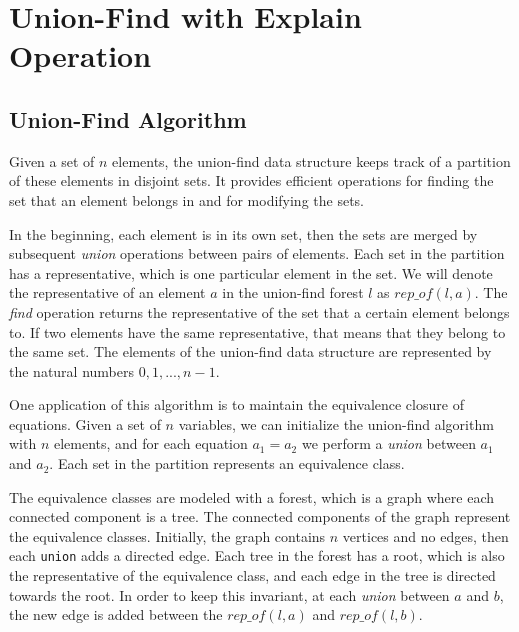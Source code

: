 
\chapter{Union-Find with Explain Operation}\label{chapter:union_find}

\section{Union-Find Algorithm}
\label{section:uf-algorithm}

Given a set of $n$ elements, the union-find data structure keeps track of a partition of these elements in disjoint sets. It provides efficient operations for finding the set that an element belongs in and for modifying the sets.

In the beginning, each element is in its own set, then the sets are merged by subsequent \emph{union} operations between pairs of elements. Each set in the partition has a representative, which is one particular element in the set. We will denote the representative of an element $a$ in the union-find forest $l$ as $rep\_of(l, a)$. The \emph{find} operation returns the representative of the set that a certain element belongs to. If two elements have the same representative, that means that they belong to the same set. The elements of the union-find data structure are represented by the natural numbers $0,1,...,n-1$.

One application of this algorithm is to maintain the equivalence closure of equations. Given a set of $n$ variables, we can initialize the union-find algorithm with $n$ elements, and for each equation $a_1 = a_2$ we perform a \emph{union} between $a_1$ and $a_2$. Each set in the partition represents an equivalence class.

The equivalence classes are modeled with a forest, which is a graph where each connected component is a tree. The connected components of the graph represent the equivalence classes. Initially, the graph contains $n$ vertices and no edges, then each \lstinline{union} adds a directed edge.  Each tree in the forest has a root, which is also the representative of the equivalence class, and each edge in the tree is directed towards the root. In order to keep this invariant, at each \emph{union} between $a$ and $b$, the new edge is added between the $rep\_of(l,a)$ and $rep\_of(l, b)$.

